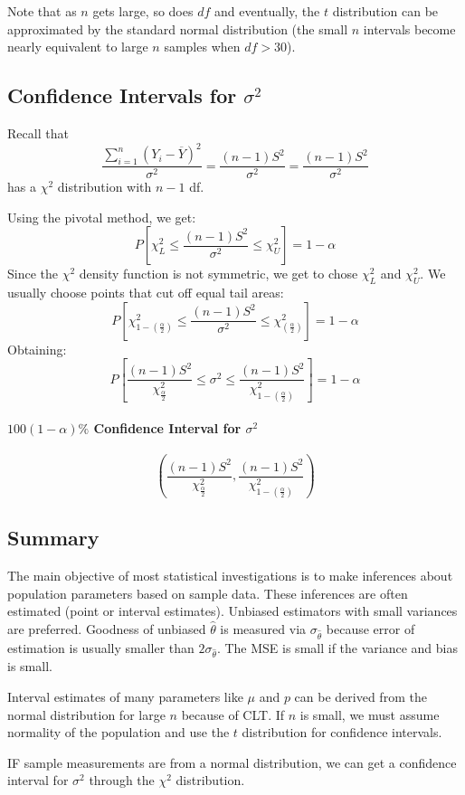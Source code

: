 \documentclass[12 pt]{article}
\theoremstyle{definition}
\begin{document}
Note that as $n$ gets large, so does $df$ and eventually, the $t$
distribution can be approximated by the standard normal distribution
(the small $n$ intervals become nearly equivalent to large $n$ samples
when $df > 30$).
\subsection{Confidence Intervals for $\sigma^2$}
Recall that $$\frac{\sum_{i=1}^n (Y_i -
  \overline{Y})^2}{\sigma^2}=\frac{(n-1)S^2}{\sigma^2} =
\frac{(n-1)S^2}{\sigma^2}$$ has a $\chi^2$ distribution with $n-1$
df.

Using the pivotal method, we get:
$$P \left[\chi_L^2 \leq \frac{(n-1)S^2}{\sigma^2} \leq \chi_U^2\right]
= 1 - \alpha $$
Since the $\chi^2$ density function is not symmetric, we get to chose
$\chi_L^2$ and $\chi_U^2$. We usually choose points that cut off equal
tail areas:
$$P \left[\chi_{1-(\frac{\alpha}{2})}^2 \leq \frac{(n-1)S^2}{\sigma^2} \leq \chi_{\left(\frac{\alpha}{2}\right)}^2\right]
= 1 - \alpha $$
Obtaining:
$$P \left[\frac{(n-1)S^2}{\chi^2_{\frac{\alpha}{2}}} \leq \sigma^2
  \leq
  \frac{(n-1)S^2}{\chi^2_{1-\left(\frac{\alpha}{2}\right)}}\right] = 1- \alpha$$
\paragraph{$100(1-\alpha)\%$ Confidence Interval for $\sigma^2$}
$$
\left(
  \frac{(n-1)S^2}{\chi^2_{\frac{\alpha}{2}}}, \frac{(n-1)S^2}{\chi^2_{1-
      \left(
        \frac{\alpha}{2}
      \right)}}
\right)$$
\subsection{Summary}
The main objective of most statistical investigations is to make
inferences about population parameters based on sample data. These
inferences are often estimated (point or interval estimates). Unbiased
estimators with small variances are preferred. Goodness of unbiased
$\hat{\theta}$ is measured via $\sigma_{\hat{\theta}}$ because error
of estimation is usually smaller than $2\sigma_{\hat{\theta}}$. The
MSE is small if the variance and bias is small.

Interval estimates of many parameters like $\mu$ and $p$ can be
derived from the normal distribution for large $n$ because of CLT. If
$n$ is small, we must assume normality of the population and use the
$t$ distribution for confidence intervals.

IF sample measurements are from a normal distribution, we can get a
confidence interval for $\sigma^2$ through the $\chi^2$ distribution. 
\end{document}
